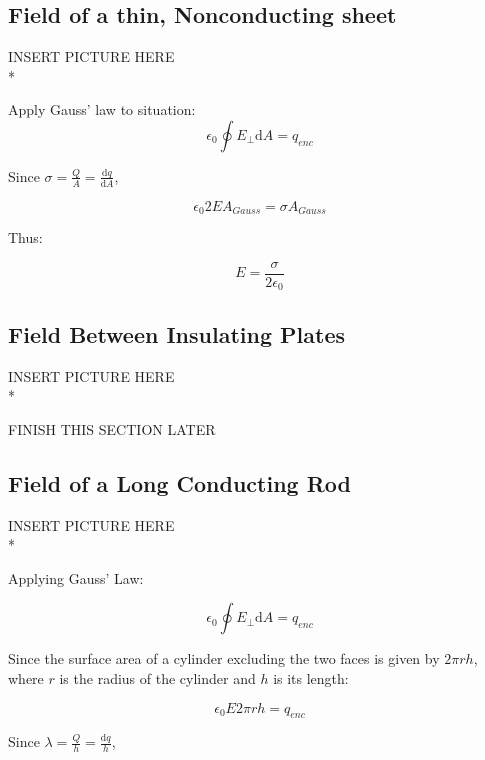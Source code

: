 \documentclass[a4paper,12pt]{article}
\begin{document}
				\subsection{Field of a thin, Nonconducting sheet}
					INSERT PICTURE HERE\\*

					Apply Gauss' law to situation:
					\begin{equation*}
							\epsilon_{0} \oint E_{\bot} \mathrm{d}A = q_{enc}
					\end{equation*}

					Since $\sigma= \frac{Q}{A} = \frac{\mathrm{d}q}{\mathrm{d}A}$,

					\begin{equation*}
							\epsilon_{0}2E A_{Gauss} = \sigma A_{Gauss}
					\end{equation*}

					Thus:

					\begin{equation*}
							E = \frac{\sigma}{2\epsilon_{0}}
					\end{equation*}

				\subsection{Field Between Insulating Plates}
					INSERT PICTURE HERE\\*

				    FINISH THIS SECTION LATER	

				\subsection{Field of a Long Conducting Rod}
					INSERT PICTURE HERE\\*

					Applying Gauss' Law:
					
					\begin{equation*}
							\epsilon_{0} \oint E_{\bot} \mathrm{d}A = q_{enc}
					\end{equation*}

					Since the surface area of a cylinder excluding the two faces is given by $2\pi r h$, where $r$ is the radius of the cylinder and $h$ is its length:

					\begin{equation*}
							\epsilon_{0} E 2 \pi r h = q_{enc}
					\end{equation*}

					Since $\lambda = \frac{Q}{h} = \frac{\mathrm{d}q}{h}$,
\end{document}
